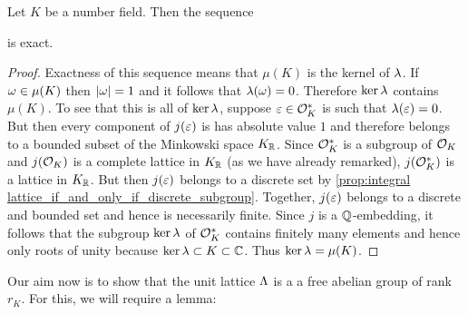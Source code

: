     \begin{proposition}\label{prop:exact_sequence_for_Dirichlets_unit_theorem}
      Let $K$ be a number field. Then the sequence

      \begin{center}
      \end{center}

      is exact.
    \end{proposition}
    \begin{proof}
      Exactness of this sequence means that $\mu(K)$ is the kernel of $\lambda$. If $\omega \in \mu(K)$ then $|\omega| = 1$ and it follows that $\lambda(\omega) = 0$. Therefore $\ker\lambda$ contains $\mu(K)$. To see that this is all of $\ker\lambda$, suppose $\varepsilon \in \mathcal{O}_{K}^{\ast}$ is such that $\lambda(\varepsilon) = 0$. But then every component of $j(\varepsilon)$ is has absolute value $1$ and therefore belongs to a bounded subset of the Minkowski space $K_{\mathbb{R}}$. Since $\mathcal{O}_{K}^{\ast}$ is a subgroup of $\mathcal{O}_{K}$ and $j(\mathcal{O}_{K})$ is a complete lattice in $K_{\mathbb{R}}$ (as we have already remarked), $j(\mathcal{O}_{K}^{\ast})$ is a lattice in $K_{\mathbb{R}}$. But then $j(\varepsilon)$ belongs to a discrete set by \cref{prop:integral lattice_if_and_only_if_discrete_subgroup}. Together, $j(\varepsilon)$ belongs to a discrete and bounded set and hence is necessarily finite. Since $j$ is a $\mathbb{Q}$-embedding, it follows that the subgroup $\ker\lambda$ of $\mathcal{O}_{K}^{\ast}$ contains finitely many elements and hence only roots of unity because $\ker\lambda \subset K \subset \mathbb{C}$. Thus $\ker\lambda = \mu(K)$.
    \end{proof}

    Our aim now is to show that the unit lattice $\Lambda$ is a a free abelian group of rank $r_{K}$. For this, we will require a lemma:

